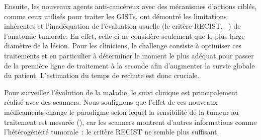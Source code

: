 \documentclass[main.tex]{subfiles}
\begin{document}
Ensuite, les nouveaux agents anti-cancéreux avec des mécanismes d'actions ciblés, comme ceux utilisés pour traiter les GISTs, ont démontré les limitations inhérentes et l'inadéquation de  l'évaluation usuelle (\ie le critère RECIST, \cf~\cite{suzuki2008}) de l'anatomie tumorale. En effet, celle-ci ne considère seulement que le plus large diamètre de la lésion. 
Pour les cliniciens, le challenge consiste à optimiser ces traitements et en particulier à déterminer le moment le plus adéquat pour passer de la première ligne de traitement à la seconde afin d'augmenter la survie globale du patient. L'estimation du temps de rechute est donc cruciale.


Pour surveiller l'évolution de la maladie, le suivi clinique est principalement réalisé avec des scanners. 
Nous soulignons que l'effet de ces nouveaux médicaments change le paradigme selon lequel la sensibilité de la tumeur au traitement est mesurée (\cf \cite{schramm2013}), car les scanners montrent d'autres informations comme l'hétérogénéité tumorale~: le critère RECIST ne semble plus suffisant.
\end{document}
